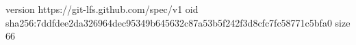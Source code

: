 version https://git-lfs.github.com/spec/v1
oid sha256:7ddfdee2da326964dec95349b645632c87a53b5f242f3d8cfc7fc58771c5bfa0
size 66
